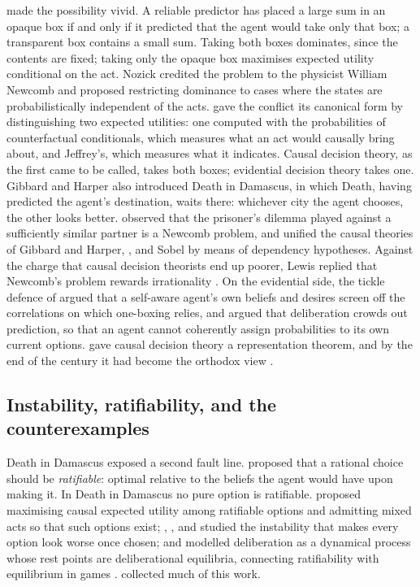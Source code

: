 \textcite{nozick1969} made the possibility vivid. A reliable predictor has placed a large sum in an
opaque box if and only if it predicted that the agent would take only that box; a transparent box
contains a small sum. Taking both boxes dominates, since the contents are fixed; taking only the
opaque box maximises expected utility conditional on the act. Nozick credited the problem to the
physicist William Newcomb and proposed restricting dominance to cases where the states are
probabilistically independent of the acts. \textcite{gibbardharper1978} gave the conflict its
canonical form by distinguishing two expected utilities: one computed with the probabilities of
counterfactual conditionals, which measures what an act would causally bring about, and Jeffrey's,
which measures what it indicates. Causal decision theory, as the first came to be called, takes both
boxes; evidential decision theory takes one. Gibbard and Harper also introduced Death in Damascus, in
which Death, having predicted the agent's destination, waits there: whichever city the agent
chooses, the other looks better. \textcite{lewis1979} observed that the prisoner's dilemma played
against a sufficiently similar partner is a Newcomb problem, and \textcite{lewis1981cdt} unified the
causal theories of Gibbard and Harper, \textcite{skyrms1980,skyrms1982}, and Sobel \autocite[see][]{sobel1994} by means of
dependency hypotheses. Against the charge that causal decision theorists end up poorer, Lewis
replied that Newcomb's problem rewards irrationality \autocite{lewis1981rich}. On the evidential side,
the tickle defence of \textcite{eells1982} argued that a self-aware agent's own beliefs and desires screen
off the correlations on which one-boxing relies, and \textcite{spohn1977} argued that deliberation
crowds out prediction, so that an agent cannot coherently assign probabilities to its own current
options. \textcite{joyce1999} gave causal decision theory a representation theorem, and by the end of
the century it had become the orthodox view \autocite{weirich2024sep}.

\subsection{Instability, ratifiability, and the counterexamples}

Death in Damascus exposed a second fault line. \textcite{jeffrey1981,jeffrey1983} proposed that a
rational choice should be \emph{ratifiable}: optimal relative to the beliefs the agent would have
upon making it. In Death in Damascus no pure option is ratifiable. \textcite{harper1986} proposed
maximising causal expected utility among ratifiable options and admitting mixed acts so that such
options exist; \textcite{richter1984}, \textcite{weirich1985}, and \textcite{rabinowicz1988} studied the
instability that makes every option look worse once chosen; and \textcite{skyrms1990dynamics}
modelled deliberation as a dynamical process whose rest points are deliberational equilibria,
connecting ratifiability with equilibrium in games \autocite{skyrms1990ratif}. \textcite{sobel1994}
collected much of this work.

